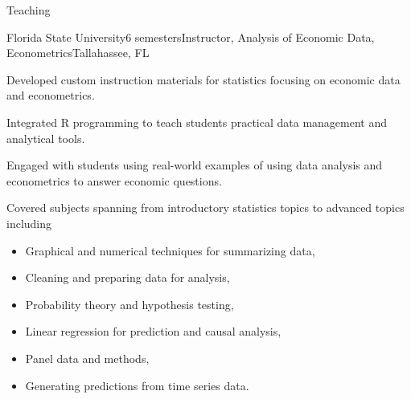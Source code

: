 \documentclass{resume} %
\begin{document}
\begin{rSection}{Teaching}
    \begin{rSubsection}{Florida State University}{6 semesters}{Instructor, Analysis of Economic Data, Econometrics}{Tallahassee, FL}
        \item Developed custom instruction materials for statistics focusing on economic data and econometrics.
        \item Integrated R programming to teach students practical data management and analytical tools.
        \item Engaged with students using real-world examples of using data analysis and econometrics to answer economic questions.
        \item Covered subjects spanning from introductory statistics topics to advanced topics including
        
        \begin{itemize}
            \item Graphical and numerical techniques for summarizing data,
            \item Cleaning and preparing data for analysis,
            \item Probability theory and hypothesis testing,
            \item Linear regression for prediction and causal analysis,
            \item Panel data and methods,
            \item Generating predictions from time series data.
        \end{itemize}
    \end{rSubsection}
\end{rSection}
\end{document}
